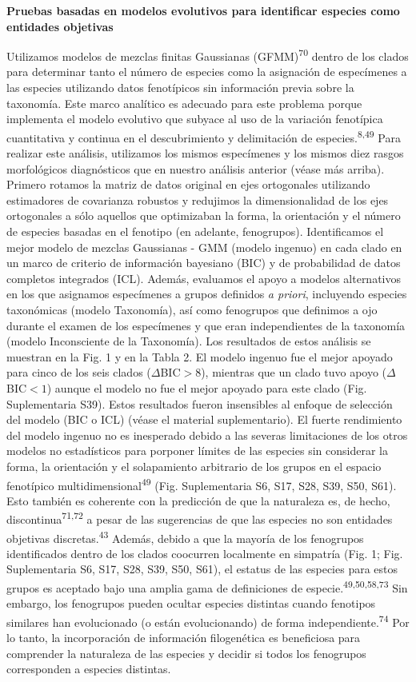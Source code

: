 \documentclass[
  11pt,
]{article}
\begin{document}
\textbf{Pruebas basadas en modelos evolutivos para identificar especies como entidades objetivas}

Utilizamos modelos de mezclas finitas Gaussianas (GFMM)\textsuperscript{70} dentro de los clados para determinar tanto el número de especies como la asignación de especímenes a las especies utilizando datos fenotípicos sin información previa sobre la taxonomía. Este marco analítico es adecuado para este problema porque implementa el modelo evolutivo que subyace al uso de la variación fenotípica cuantitativa y continua en el descubrimiento y delimitación de especies.\textsuperscript{8,49} Para realizar este análisis, utilizamos los mismos especímenes y los mismos diez rasgos morfológicos diagnósticos que en nuestro análisis anterior (véase más arriba). Primero rotamos la matriz de datos original en ejes ortogonales utilizando estimadores de covarianza robustos y redujimos la dimensionalidad de los ejes ortogonales a sólo aquellos que optimizaban la forma, la orientación y el número de especies basadas en el fenotipo (en adelante, fenogrupos). Identificamos el mejor modelo de mezclas Gaussianas - GMM (modelo ingenuo) en cada clado en un marco de criterio de información bayesiano (BIC) y de probabilidad de datos completos integrados (ICL). Además, evaluamos el apoyo a modelos alternativos en los que asignamos especímenes a grupos definidos \emph{a priori}, incluyendo especies taxonómicas (modelo Taxonomía), así como fenogrupos que definimos a ojo durante el examen de los especímenes y que eran independientes de la taxonomía (modelo Inconsciente de la Taxonomía). Los resultados de estos análisis se muestran en la Fig. 1 y en la Tabla 2. El modelo ingenuo fue el mejor apoyado para cinco de los seis clados (\(\Delta\)BIC\(>8\)), mientras que un clado tuvo apoyo (\(\Delta\)BIC\(<1\)) aunque el modelo no fue el mejor apoyado para este clado (Fig. Suplementaria S39). Estos resultados fueron insensibles al enfoque de selección del modelo (BIC o ICL) (véase el material suplementario). El fuerte rendimiento del modelo ingenuo no es inesperado debido a las severas limitaciones de los otros modelos no estadísticos para porponer límites de las especies sin considerar la forma, la orientación y el solapamiento arbitrario de los grupos en el espacio fenotípico multidimensional\textsuperscript{49} (Fig. Suplementaria S6, S17, S28, S39, S50, S61). Esto también es coherente con la predicción de que la naturaleza es, de hecho, discontinua\textsuperscript{71,72} a pesar de las sugerencias de que las especies no son entidades objetivas discretas.\textsuperscript{43} Además, debido a que la mayoría de los fenogrupos identificados dentro de los clados coocurren localmente en simpatría (Fig. 1; Fig. Suplementaria S6, S17, S28, S39, S50, S61), el estatus de las especies para estos grupos es aceptado bajo una amplia gama de definiciones de especie.\textsuperscript{49,50,58,73} Sin embargo, los fenogrupos pueden ocultar especies distintas cuando fenotipos similares han evolucionado (o están evolucionando) de forma independiente.\textsuperscript{74} Por lo tanto, la incorporación de información filogenética es beneficiosa para comprender la naturaleza de las especies y decidir si todos los fenogrupos corresponden a especies distintas.
\end{document}
